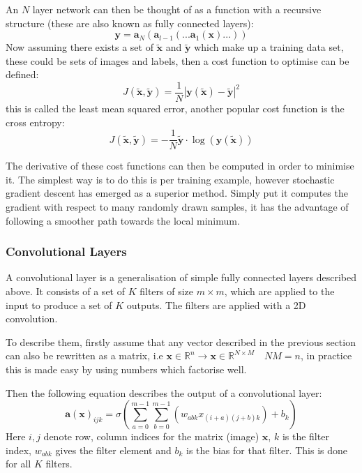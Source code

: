 \documentclass[9pt]{article} \usepackage{amsmath, amsthm, amssymb}
\begin{document}
An $N$ layer network can
then be thought of as a function with a recursive structure (these are also known as fully connected layers):
\begin{equation}
    \mathbf{y} = \mathbf{a}_{N}(\mathbf{a}_{l-1}(...\mathbf{a}_1(\mathbf{x})...))
\end{equation}
Now assuming there exists a set of $\tilde{\mathbf{x}}$ and $\tilde{\mathbf{y}}$ which make
up a training data set, these could be sets of images and labels, then a cost function
to optimise can be defined:
\begin{equation}
    J(\tilde{\mathbf{x}},\tilde{\mathbf{y}}) = \frac{1}{N}\left |\mathbf{y}(\tilde{\mathbf{x}})-\tilde{\mathbf{y}}\right | ^2
\end{equation}
this is called the least mean squared error, another popular cost function is
the cross entropy:
\begin{equation}
    J(\tilde{\mathbf{x}},\tilde{\mathbf{y}}) = -\frac{1}{N}\tilde{\mathbf{y}}\cdot\log(\mathbf{y}(\tilde{\mathbf{x}}))
\end{equation}

The derivative of these cost functions can then be computed in order to minimise it.
The simplest way is to do this is per training example, however stochastic gradient
descent\cite{Amari1993} has emerged as a superior method. Simply put it computes the gradient with respect
to many randomly drawn samples, it has the advantage of following a smoother path
towards the local minimum.
\subsubsection*{Convolutional Layers}
A convolutional layer is a generalisation of simple fully connected layers described
above. It consists of a set of $K$ filters of size $m\times m$, which are applied to the input to produce
a set of $K$ outputs. The filters are applied with a 2D convolution.


To describe them, firstly assume that any vector described in the previous section
can also be rewritten as a matrix, i.e $\mathbf{x} \in \mathbb{R}^{n} 
\rightarrow \mathbf{x} \in \mathbb{R}^{N \times M} \quad NM=n$, in practice this is made
easy by using numbers which factorise well.

Then the following equation describes the output of a convolutional layer:
\begin{equation} \label{CNN}
    \mathbf{a}(\mathbf{x})_{ijk} = \sigma \left ( \sum_{a=0}^{m-1}\sum_{b=0}^{m-1}(w_{abk}x_{(i+a)(j+b)k}) + b_k \right )
\end{equation}
Here $i,j$  denote row, column indices for the matrix (image) $\mathbf{x}$, $k$ is the filter index, $w_{abk}$ 
gives the filter element and $b_k$ is the bias for that filter. This is done for all $K$ filters.
\end{document}
